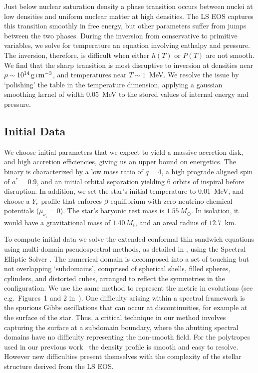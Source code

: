 Just below nuclear saturation density a phase transition occurs
between nuclei at low densities and uniform nuclear matter at high densities.
The LS EOS captures this transition smoothly in free energy, but other parameters suffer from
jumps between the two phases. During the inversion from conservative to primitive variables,
we solve for temperature an equation involving enthalpy and pressure.
The inversion, therefore, is difficult
when either $h(T)$ or $P(T)$ are not smooth. We find that the sharp transition
is most disruptive to inversion at densities near $\rho \sim 10^{14}\rm\,g\,cm^{-3}$,
and temperatures near $T \sim 1$~MeV.
We resolve the issue by `polishing' the table in the temperature dimension,
applying a gaussian smoothing kernel of width 0.05~MeV to the stored values
of internal energy and pressure.

\subsection{Initial Data}
\label{sec:ID}

We choose initial parameters that we expect to yield a massive accretion disk,
and high accretion efficiencies, giving us an upper bound on energetics.
The binary is characterized by a low mass ratio of $q=4$,
a high prograde aligned spin of $a^{*}=0.9$,
and an initial orbital separation yielding 6 orbits of inspiral before disruption.
In addition, we set the star's initial temperature to 0.01~MeV, and choose
a $Y_e$ profile that enforces $\beta$-equilibrium with zero neutrino
chemical potentials ($\mu_{\nu_i}=0$).
The star's baryonic rest mass is $1.55\,M_\odot$.  In isolation, it
would have a gravitational mass of $1.40\,M_\odot$ and an areal radius
of $12.7$~km.

To compute initial data we solve the extended conformal thin sandwich equations
using multi-domain pseudospectral methods, as detailed in
\cite{fouc2008-nsbh_initial_data}, using the Spectral Elliptic Solver
\citep{pfei2003-bbh_initial_data,pfei2003-spells,pfei2004-initial_data}.
The numerical domain is decomposed into a set of touching but not overlapping
`subdomains', comprised of spherical shells, filled spheres, cylinders,
and distorted cubes, arranged to reflect the symmetries in the configuration.
We use the same method to represent
the metric in evolutions (see e.g.\ Figures~1 and 2 in~\citealt{fouc2013-compactness_and_spin}).
One difficulty arising within a spectral framework
is the spurious Gibbs oscillations that can occur at discontinuities,
for example at the surface of the star.
Thus, a critical technique in our method involves capturing the
surface at a subdomain boundary, where the abutting spectral domains
have no difficulty representing the non-smooth field.
For the polytropes used in our previous
work~\citep{duez2009-3d_eos_advection,fouc2010-nsbh_bh_spin,fouc2011-10msun_bh,fouc2012-disk_mass,fouc2013-compactness_and_spin}
the density profile is smooth and
easy to resolve.  However new difficulties present themselves
with the complexity of the stellar structure derived from the LS EOS.

